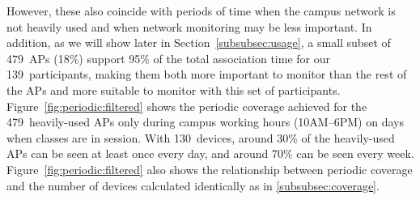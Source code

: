 However, these also coincide with periods of time when the campus \wifi{}
network is not heavily used and when network monitoring may be less
important. In addition, as we will show later in
Section~\ref{subsubsec:usage}, a small subset of 479~APs (18\%) support 95\%
of the total \wifi{} association time for our 139~participants, making them
both more important to monitor than the rest of the APs and more suitable to
monitor with this set of participants. Figure~\ref{fig:periodic:filtered}
shows the periodic coverage achieved for the 479~heavily-used APs only during
campus working hours (10AM--6PM) on days when classes are in session. With
130~devices, around 30\% of the heavily-used APs can be seen at least once
every day, and around 70\% can be seen every week.
Figure~\ref{fig:periodic:filtered} also shows the relationship between
periodic coverage and the number of devices calculated identically as in
\ref{subsubsec:coverage}.

%
% 
% 
% 
% 
